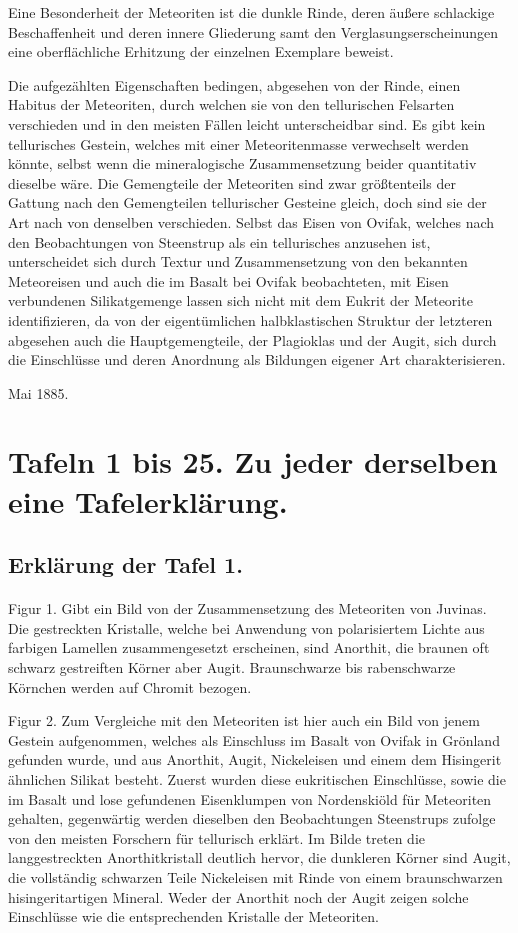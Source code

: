 \documentclass[a4paper, 11pt, oneside, polutonikogreek, german]{article}
\begin{document}
Eine Besonderheit der Meteoriten ist die dunkle Rinde, deren äußere schlackige Beschaffenheit und deren innere Gliederung samt den Verglasungserscheinungen eine oberflächliche Erhitzung der einzelnen Exemplare beweist.

Die aufgezählten Eigenschaften bedingen, abgesehen von der Rinde, einen Habitus der Meteoriten, durch welchen sie von den tellurischen Felsarten verschieden und in den meisten Fällen leicht unterscheidbar sind. Es gibt kein tellurisches Gestein, welches mit einer Meteoritenmasse verwechselt werden könnte, selbst wenn die mineralogische Zusammensetzung beider quantitativ dieselbe wäre. Die Gemengteile der Meteoriten sind zwar größtenteils der Gattung nach den Gemengteilen tellurischer Gesteine gleich, doch sind sie der Art nach von denselben verschieden. Selbst das Eisen von Ovifak, welches nach den Beobachtungen von Steenstrup als ein tellurisches anzusehen ist, unterscheidet sich durch Textur und Zusammensetzung von den bekannten Meteoreisen und auch die im Basalt bei Ovifak beobachteten, mit Eisen verbundenen Silikatgemenge lassen sich nicht mit dem Eukrit der Meteorite identifizieren, da von der eigentümlichen halbklastischen Struktur der letzteren abgesehen auch die Hauptgemengteile, der Plagioklas und der Augit, sich durch die Einschlüsse und deren Anordnung als Bildungen eigener Art charakterisieren.

Mai 1885.
\clearpage
\pagestyle{fancy}
\fancyhf{}
\section{Tafeln 1 bis 25. Zu jeder derselben eine Tafelerklärung.}
\subsection{Erklärung der Tafel 1.}
\paragraph{}
Figur 1. Gibt ein Bild von der Zusammensetzung des Meteoriten von Juvinas. Die gestreckten Kristalle, welche bei Anwendung von polarisiertem Lichte aus farbigen Lamellen zusammengesetzt erscheinen, sind Anorthit, die braunen oft schwarz gestreiften Körner aber Augit. Braunschwarze bis rabenschwarze Körnchen werden auf Chromit bezogen.

Figur 2. Zum Vergleiche mit den Meteoriten ist hier auch ein Bild von jenem Gestein aufgenommen, welches als Einschluss im Basalt von Ovifak in Grönland gefunden wurde, und aus Anorthit, Augit, Nickeleisen und einem dem Hisingerit ähnlichen Silikat besteht. Zuerst wurden diese eukritischen Einschlüsse, sowie die im Basalt und lose gefundenen Eisenklumpen von Nordenskiöld für Meteoriten gehalten, gegenwärtig werden dieselben den Beobachtungen Steenstrups zufolge von den meisten Forschern für tellurisch erklärt. Im Bilde treten die langgestreckten Anorthitkristall deutlich hervor, die dunkleren Körner sind Augit, die vollständig schwarzen Teile Nickeleisen mit Rinde von einem braunschwarzen hisingeritartigen Mineral. Weder der Anorthit noch der Augit zeigen solche Einschlüsse wie die entsprechenden Kristalle der Meteoriten.
\end{document}
